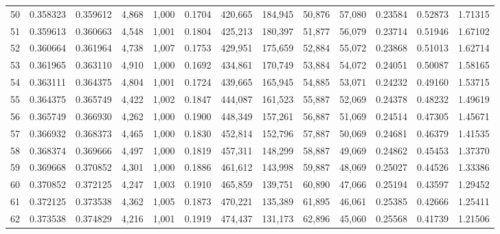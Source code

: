 \begin{tabular}{rrrrrrrrrrrrr}
50  &  0.358323 &  0.359612 &   4,868 &  1,000 &                                     0.1704 &  420,665 &  184,945 &   50,876 &   57,080 &  0.23584 &  0.52873 &  1.71315 \\
51  &  0.359613 &  0.360663 &   4,548 &  1,001 &                                     0.1804 &  425,213 &  180,397 &   51,877 &   56,079 &  0.23714 &  0.51946 &  1.67102 \\
52  &  0.360664 &  0.361964 &   4,738 &  1,007 &                                     0.1753 &  429,951 &  175,659 &   52,884 &   55,072 &  0.23868 &  0.51013 &  1.62714 \\
53  &  0.361965 &  0.363110 &   4,910 &  1,000 &                                     0.1692 &  434,861 &  170,749 &   53,884 &   54,072 &  0.24051 &  0.50087 &  1.58165 \\
54  &  0.363111 &  0.364375 &   4,804 &  1,001 &                                     0.1724 &  439,665 &  165,945 &   54,885 &   53,071 &  0.24232 &  0.49160 &  1.53715 \\
55  &  0.364375 &  0.365749 &   4,422 &  1,002 &                                     0.1847 &  444,087 &  161,523 &   55,887 &   52,069 &  0.24378 &  0.48232 &  1.49619 \\
56  &  0.365749 &  0.366930 &   4,262 &  1,000 &                                     0.1900 &  448,349 &  157,261 &   56,887 &   51,069 &  0.24514 &  0.47305 &  1.45671 \\
57  &  0.366932 &  0.368373 &   4,465 &  1,000 &                                     0.1830 &  452,814 &  152,796 &   57,887 &   50,069 &  0.24681 &  0.46379 &  1.41535 \\
58  &  0.368374 &  0.369666 &   4,497 &  1,000 &                                     0.1819 &  457,311 &  148,299 &   58,887 &   49,069 &  0.24862 &  0.45453 &  1.37370 \\
59  &  0.369668 &  0.370852 &   4,301 &  1,000 &                                     0.1886 &  461,612 &  143,998 &   59,887 &   48,069 &  0.25027 &  0.44526 &  1.33386 \\
60  &  0.370852 &  0.372125 &   4,247 &  1,003 &                                     0.1910 &  465,859 &  139,751 &   60,890 &   47,066 &  0.25194 &  0.43597 &  1.29452 \\
61  &  0.372125 &  0.373538 &   4,362 &  1,005 &                                     0.1873 &  470,221 &  135,389 &   61,895 &   46,061 &  0.25385 &  0.42666 &  1.25411 \\
62  &  0.373538 &  0.374829 &   4,216 &  1,001 &                                     0.1919 &  474,437 &  131,173 &   62,896 &   45,060 &  0.25568 &  0.41739 &  1.21506 \\

\end{tabular}
